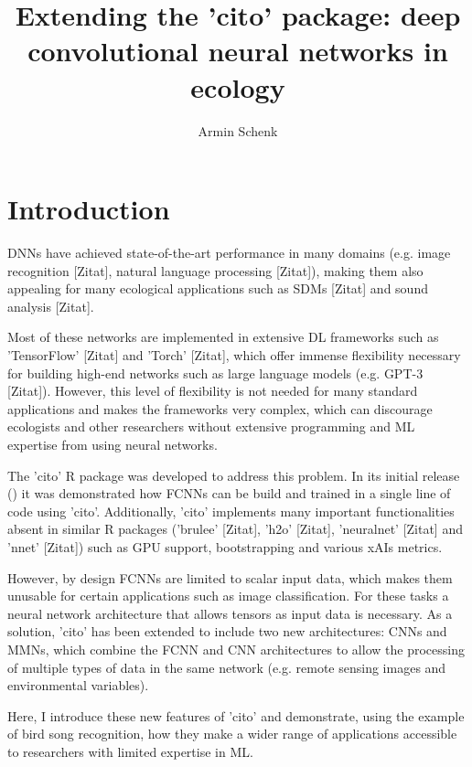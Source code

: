 \documentclass{article}
\author{Armin Schenk}
\title{Extending the 'cito' package: deep convolutional neural networks in ecology}
\begin{document}
\maketitle

\begin{abstract} 
\end{abstract}

\newpage
\tableofcontents
\newpage
\section{Introduction}
\acp{DNN} have achieved state-of-the-art performance in many domains (e.g. image recognition [Zitat], natural language processing [Zitat]), making them also appealing for many ecological applications such as \acp{SDM} [Zitat] and sound analysis [Zitat].

Most of these networks are implemented in extensive \ac{DL} frameworks such as 'TensorFlow' [Zitat] and 'Torch' [Zitat], which offer immense flexibility necessary for building high-end networks such as large language models (e.g. GPT-3 [Zitat]). However, this level of flexibility is not needed for many standard applications and makes the frameworks very complex, which can discourage ecologists and other researchers without extensive programming and \ac{ML} expertise from using neural networks.

 

The 'cito' R package was developed to address this problem. In its initial release (\cite{amesoderCitoPackageTraining2024}) it was demonstrated how \acp{FCNN} can be build and trained in a single line of code using 'cito'. Additionally, 'cito' implements many important functionalities absent in similar R packages ('brulee' [Zitat], 'h2o' [Zitat], 'neuralnet' [Zitat] and 'nnet' [Zitat]) such as GPU support, bootstrapping and various \acp{xAI} metrics.

However, by design \acp{FCNN} are limited to scalar input data, which makes them unusable for certain applications such as image classification. For these tasks a neural network architecture that allows tensors as input data is necessary.
As a solution, 'cito' has been extended to include two new architectures: \acp{CNN} and \acp{MMN}, which combine the \ac{FCNN} and \ac{CNN} architectures to allow the processing of multiple types of data in the same network (e.g. remote sensing images and environmental variables).

Here, I introduce these new features of 'cito' and demonstrate, using the example of bird song recognition, how they make a wider range of applications accessible to researchers with limited expertise in \ac{ML}.
\end{document}
